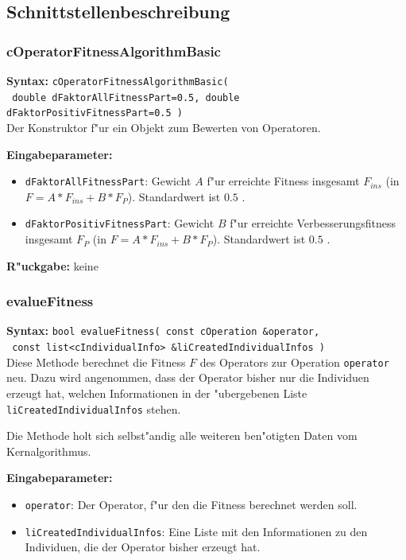 \subsection{Schnittstellenbeschreibung}

\subsubsection{cOperatorFitnessAlgorithmBasic}

\textbf{Syntax:} \verb|cOperatorFitnessAlgorithmBasic(| \\\verb| double dFaktorAllFitnessPart=0.5, double dFaktorPositivFitnessPart=0.5 )| \\

Der Konstruktor f"ur ein Objekt zum Bewerten von Operatoren.

\bigskip\noindent
\textbf{Eingabeparameter:}
\begin{itemize}
 \item \verb|dFaktorAllFitnessPart|: Gewicht $A$ f"ur erreichte Fitness insgesamt $F_{ins}$ (in $F=A*F_{ins}+B*F_P$). Standardwert ist $0.5$ .
 \item \verb|dFaktorPositivFitnessPart|: Gewicht $B$ f"ur erreichte Verbesserungsfitness insgesamt $F_P$ (in $F=A*F_{ins}+B*F_P$). Standardwert ist $0.5$ .
\end{itemize}

\bigskip\noindent
\textbf{R"uckgabe:} keine


\subsubsection{evalueFitness}

\textbf{Syntax:} \verb|bool evalueFitness( const cOperation &operator, | \\\verb| const list<cIndividualInfo> &liCreatedIndividualInfos )| \\

Diese Methode berechnet die Fitness $F$ des Operators zur Operation \verb|operator| neu. Dazu wird angenommen, dass der Operator bisher nur die Individuen erzeugt hat, welchen Informationen in der "ubergebenen Liste \verb|liCreatedIndividualInfos| stehen.

Die Methode holt sich selbst"andig alle weiteren ben"otigten Daten vom Kernalgorithmus.

\bigskip\noindent
\textbf{Eingabeparameter:}
\begin{itemize}
 \item \verb|operator|: Der Operator, f"ur den die Fitness berechnet werden soll.
 \item \verb|liCreatedIndividualInfos|: Eine Liste mit den Informationen zu den Individuen, die der Operator bisher erzeugt hat.
\end{itemize}

